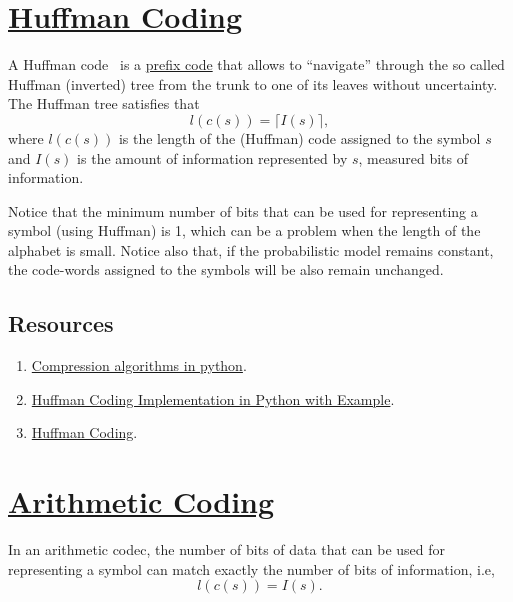 \section{\href{https://en.wikipedia.org/wiki/Huffman_coding}{Huffman Coding}}

A Huffman code~\cite{vruiz__huffman_coding} is a
\href{https://en.wikipedia.org/wiki/Prefix_code}{prefix code} that
allows to ``navigate'' through the so called Huffman (inverted) tree
from the trunk to one of its leaves without
uncertainty. The Huffman tree satisfies that
\begin{equation}
  l(c(s)) = \lceil I(s)\rceil,
  \label{eq:huffman_performance}
\end{equation}
where $l(c(s))$ is the length of the (Huffman) code assigned to the
symbol $s$ and $I(s)$ is the amount of information represented by $s$,
measured bits of information.

Notice that the minimum number of bits that can be used for
representing a symbol (using Huffman) is 1, which can be a problem
when the length of the alphabet is small. Notice also that, if the
probabilistic model remains constant, the code-words assigned to the
symbols will be also remain unchanged.

\subsection*{Resources}
\begin{enumerate}
\item \href{https://www.inference.org.uk/mackay/python/compress/#Huff}{Compression algorithms in python}.
\item \href{https://favtutor.com/blogs/huffman-coding}{Huffman Coding Implementation in Python with Example}.
\item \href{https://www.programiz.com/dsa/huffman-coding}{Huffman Coding}.
\end{enumerate}

\section{\href{https://en.wikipedia.org/wiki/Arithmetic_coding}{Arithmetic
    Coding}~\cite{vruiz__arithmetic_coding}}

In an arithmetic codec, the number of bits of data that can be used for
representing a symbol can match exactly the number of bits of
information, i.e,
\begin{equation}
  l(c(s)) = I(s).
\end{equation}

